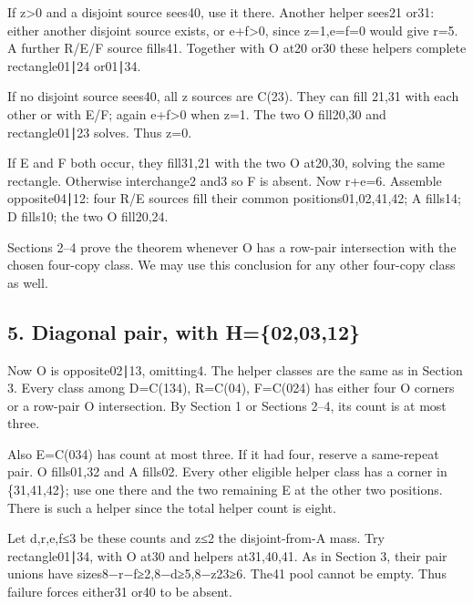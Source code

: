 \documentclass[
  10pt,
]{article}
\begin{document}
If z\textgreater0 and a disjoint source sees40, use it there. Another
helper sees21 or31: either another disjoint source exists, or
e+f\textgreater0, since z=1,e=f=0 would give r=5. A further R/E/F source
fills41. Together with O at20 or30 these helpers complete rectangle01∣24
or01∣34.

If no disjoint source sees40, all z sources are C(23). They can fill
21,31 with each other or with E/F; again e+f\textgreater0 when z=1. The
two O fill20,30 and rectangle01∣23 solves. Thus z=0.

If E and F both occur, they fill31,21 with the two O at20,30, solving
the same rectangle. Otherwise interchange2 and3 so F is absent. Now
r+e=6. Assemble opposite04∣12: four R/E sources fill their common
positions01,02,41,42; A fills14; D fills10; the two O fill20,24.

Sections 2--4 prove the theorem whenever O has a row-pair intersection
with the chosen four-copy class. We may use this conclusion for any
other four-copy class as well.

\hypertarget{diagonal-pair-with-h020312}{%
\subsection*{5. Diagonal pair, with
H=\{02,03,12\}}\label{diagonal-pair-with-h020312}}

Now O is opposite02∣13, omitting4. The helper classes are the same as in
Section 3. Every class among D=C(134), R=C(04), F=C(024) has either four
O corners or a row-pair O intersection. By Section 1 or Sections 2--4,
its count is at most three.

Also E=C(034) has count at most three. If it had four, reserve a
same-repeat pair. O fills01,32 and A fills02. Every other eligible
helper class has a corner in \{31,41,42\}; use one there and the two
remaining E at the other two positions. There is such a helper since the
total helper count is eight.

Let d,r,e,f≤3 be these counts and z≤2 the disjoint-from-A mass. Try
rectangle01∣34, with O at30 and helpers at31,40,41. As in Section 3,
their pair unions have sizes8−r−f≥2,8−d≥5,8−z23≥6. The41 pool cannot be
empty. Thus failure forces either31 or40 to be absent.
\end{document}

